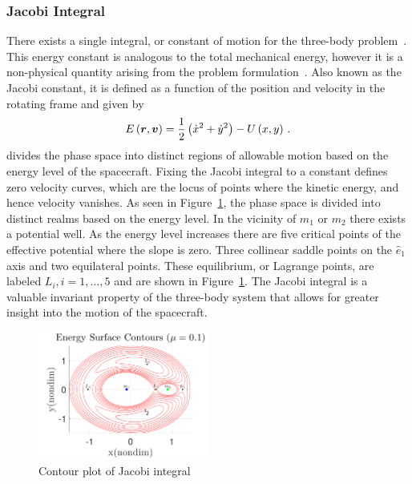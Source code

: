 \documentclass[smallcondensed]{svjour3}
\begin{document}
\subsubsection{Jacobi Integral}\label{sec:jacobi}
There exists a single integral, or constant of motion for the three-body problem~\cite{szebehely1967,lanczos1970}.
This energy constant is analogous to the total mechanical energy, however it is a non-physical quantity arising from the problem formulation~\cite{szebehely1967}.
Also known as the Jacobi constant, it is defined as a function of the position and velocity in the rotating frame and given by
\begin{equation}
        E\left( \bm{r} , \bm{v} \right) = \frac{1}{2}\left( \dot{x}^2 + \dot{y}^2\right) - U\left(x,y \right) \, .
        \label{eq:jacobi}
\end{equation}
 divides the phase space into distinct regions of allowable motion based on the energy level of the spacecraft.
Fixing the Jacobi integral to a constant defines zero velocity curves, which are the locus of points where the kinetic energy, and hence velocity vanishes.
As seen in Figure~\ref{fig:energy_contour}, the phase space is divided into distinct realms based on the energy level.
In the vicinity of \( m_1\) or \(m_2\) there exists a potential well. 
As the energy level increases there are five critical points of the effective potential where the slope is zero.
Three collinear saddle points on the \(\hat{e}_1\) axis and two equilateral points.
These equilibrium, or Lagrange points, are labeled \( L_i, i = 1, \hdots, 5 \) and are shown in Figure~\ref{fig:energy_contour}.
The Jacobi integral is a valuable invariant property of the three-body system that allows for greater insight into the motion of the spacecraft.
\begin{figure}[htbp]
        \centering
        \includegraphics[width=0.5\textwidth]{energy_contours}
        \caption{Contour plot of Jacobi integral}
        \label{fig:energy_contour}
\end{figure} 
\end{document}
